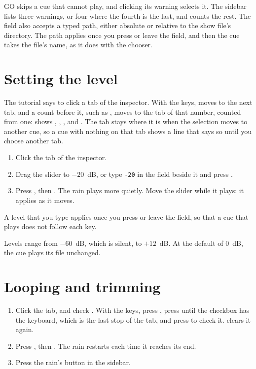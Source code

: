GO skips a cue that cannot play, and clicking its warning selects it.  The
sidebar lists three warnings, or four where the fourth is the last, and counts
the rest.  The
 field also accepts a typed path, either absolute or relative to the
show file's directory.  The path applies once you press  or leave
the field, and then the cue takes the file's name, as it does with the
chooser.

\section{Setting the level}

The tutorial says to click a tab of the inspector.  With the keys, 
moves to the next tab, and a count before it, such as , moves to the
tab of that number, counted from one:  shows , 
,  , and  \@.
The tab stays where
it is when the selection moves to another cue, so a cue with nothing on that
tab shows a line that says so until you choose another tab.

\begin{enumerate}
\item Click the  tab of the inspector.
\item Drag the slider to $-20$~dB, or type \texttt{-20} in the field beside
  it and press \@.
\item Press , then \@.  The rain plays more
  quietly.  Move the slider while it plays: it applies as it moves.
\end{enumerate}

A level that you type applies once you press  or leave the field,
so that a cue that plays does not follow each key.

Levels range from $-60$~dB, which is silent, to $+12$~dB\@.  At the default
of 0~dB, the cue plays its file unchanged.

\section{Looping and trimming}

\begin{enumerate}
\item Click the  tab, and check .  With the keys, press , press  until the checkbox
  has the keyboard, which is the last stop of the tab, and press 
  to check it.   clears it again.
\item Press , then \@.  The rain restarts each
  time it reaches its end.
\item Press the rain's  button in the sidebar.
\end{enumerate}

